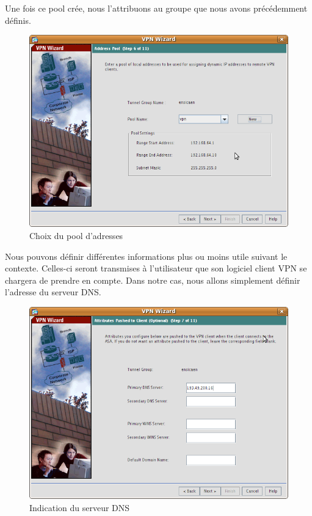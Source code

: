 \documentclass[a4paper,12pt]{article}
\begin{document}
Une fois ce pool crée, nous l'attribuons au groupe que nous avons précédemment définis.
\begin{figure}[H]
	\center
	\includegraphics[width=12cm]{img/vpn6.png}
	\caption{Choix du pool d'adresses}
\end{figure}

Nous pouvons définir différentes informations plus ou moins utile suivant le contexte. Celles-ci seront transmises à l'utilisateur que son logiciel client VPN
se chargera de prendre en compte. Dans notre cas, nous allons simplement définir l'adresse du serveur DNS.
\begin{figure}[H]
	\center
	\includegraphics[width=12cm]{img/vpn7.png}
	\caption{Indication du serveur DNS}
\end{figure}
\end{document}
